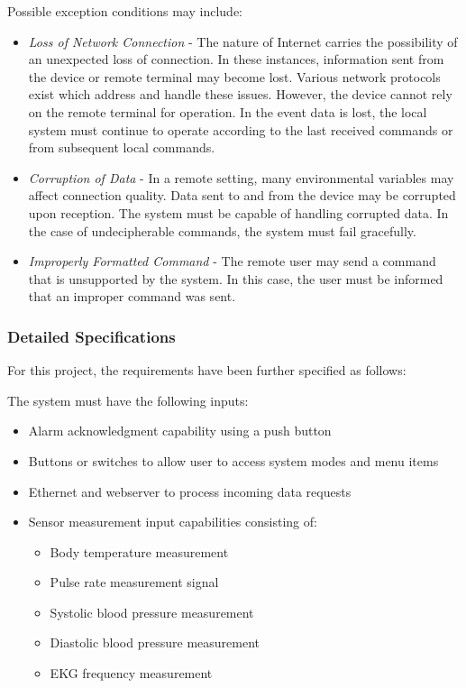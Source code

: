 \documentclass[12pt]{article} %
\begin{document}
Possible exception conditions may include:
\begin{itemize}
	\item \emph{Loss of Network Connection} - The nature of Internet carries the
		possibility of an unexpected loss of connection. In these instances,
		information sent from the device or remote terminal may become lost.
		Various network protocols exist which address and handle these
		issues. However, the device cannot rely on the remote terminal for
		operation. In the event data is lost, the local system must
		continue to operate according to the last received commands or from
		subsequent local commands.
	\item \emph{Corruption of Data} - In a remote setting, many environmental
		variables may affect connection quality. Data sent to and from the device
		may be corrupted upon reception. The system must be capable of handling
		corrupted data. In the case of undecipherable commands, the system must
		fail gracefully.
	\item \emph{Improperly Formatted Command} - The remote user may send a
		command that is unsupported by the system. In this case, the user must be
		informed that an improper command was sent.
\end{itemize}


\subsubsection{Detailed Specifications }
For this project, the requirements have been further specified as follows:

\begin{itemize}[$$]
	\item The system must have the following inputs:
		\begin{itemize}[$\bullet$]
			\item Alarm acknowledgment capability using a push button
			\item Buttons or switches to allow user to access system modes and menu items
			\item Ethernet and webserver to process incoming data requests
			\item Sensor measurement input capabilities consisting of:
				\begin{itemize}
					\item Body temperature measurement
					\item Pulse rate measurement signal
					\item Systolic blood pressure measurement
					\item Diastolic blood pressure measurement
					\item EKG frequency measurement
				\end{itemize}
    \end{itemize}
\end{itemize}
\end{document}
